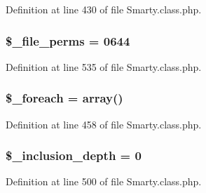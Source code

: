 \-Definition at line 430 of file \-Smarty.\-class.\-php.

\hypertarget{class_smarty_affa1e29315f40fe30ea516c7e8f2430e}{
\subsubsection[{\$\-\_\-file\-\_\-perms}]{\setlength{\rightskip}{0pt plus 5cm}\$\-\_\-file\-\_\-perms = 0644}}\label{class_smarty_affa1e29315f40fe30ea516c7e8f2430e}


\-Definition at line 535 of file \-Smarty.\-class.\-php.

\hypertarget{class_smarty_a1c8fbfed4c5eb0d511fe2d98bda8bc19}{
\subsubsection[{\$\-\_\-foreach}]{\setlength{\rightskip}{0pt plus 5cm}\$\-\_\-foreach = array()}}\label{class_smarty_a1c8fbfed4c5eb0d511fe2d98bda8bc19}


\-Definition at line 458 of file \-Smarty.\-class.\-php.

\hypertarget{class_smarty_a6167b63640563df2374a677f4ed41641}{
\subsubsection[{\$\-\_\-inclusion\-\_\-depth}]{\setlength{\rightskip}{0pt plus 5cm}\$\-\_\-inclusion\-\_\-depth = 0}}\label{class_smarty_a6167b63640563df2374a677f4ed41641}


\-Definition at line 500 of file \-Smarty.\-class.\-php.


